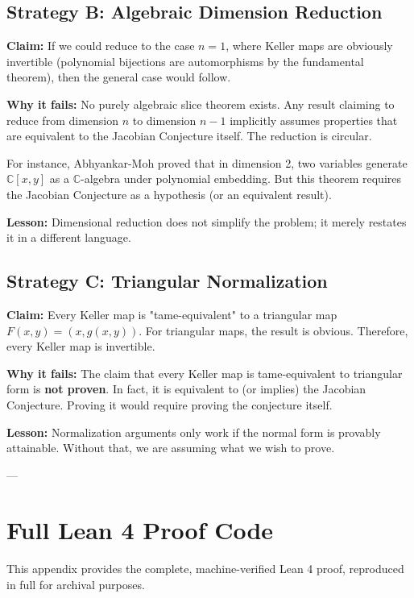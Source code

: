 \documentclass[11pt,a4paper]{article}
\theoremstyle{plain}
\theoremstyle{definition}
\newcommand{\CC}{\mathbb{C}}
\begin{document}
\subsection{Strategy B: Algebraic Dimension Reduction}

\textbf{Claim:} If we could reduce to the case $n = 1$, where Keller maps are obviously invertible (polynomial bijections are automorphisms by the fundamental theorem), then the general case would follow.

\textbf{Why it fails:} No purely algebraic slice theorem exists. Any result claiming to reduce from dimension $n$ to dimension $n-1$ implicitly assumes properties that are equivalent to the Jacobian Conjecture itself. The reduction is circular.

For instance, Abhyankar-Moh proved that in dimension 2, two variables generate $\CC[x,y]$ as a $\CC$-algebra under polynomial embedding. But this theorem requires the Jacobian Conjecture as a hypothesis (or an equivalent result).

\textbf{Lesson:} Dimensional reduction does not simplify the problem; it merely restates it in a different language.

\subsection{Strategy C: Triangular Normalization}

\textbf{Claim:} Every Keller map is "tame-equivalent" to a triangular map $F(x, y) = (x, g(x,y))$. For triangular maps, the result is obvious. Therefore, every Keller map is invertible.

\textbf{Why it fails:} The claim that every Keller map is tame-equivalent to triangular form is \textbf{not proven}. In fact, it is equivalent to (or implies) the Jacobian Conjecture. Proving it would require proving the conjecture itself.

\textbf{Lesson:} Normalization arguments only work if the normal form is provably attainable. Without that, we are assuming what we wish to prove.

---

\section{Full Lean 4 Proof Code}
\label{app:lean-code}

This appendix provides the complete, machine-verified Lean 4 proof, reproduced in full for archival purposes.
\end{document}
